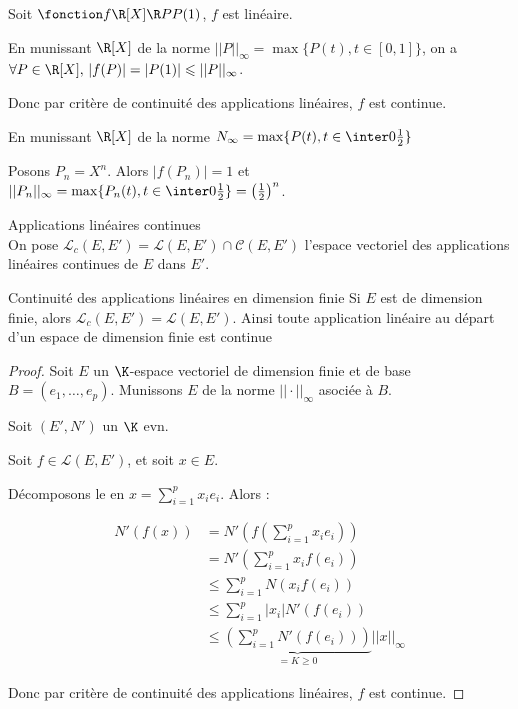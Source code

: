 \begin{exemple}
    Soit $\fonction f {\R[X]} \R P {P(1)}$, $f$ est linéaire. 

    \avspace En munissant $\R[X]$ de la norme $||P||_\infty = \max\{P(t), t \in [0, 1]\}$, on a 
    $\forall P \in \R[X], \, |f(P)| = |P(1)| \leqslant ||P||_\infty$.

    Donc par critère de continuité des applications linéaires, $f$ est continue.

    \avspace En munissant $\R[X]$ de la norme $N_\infty = \max\{P(t), t \in \inter 0 {\frac 1 2}\}$

    Posons $P_n = X^n$. Alors $| f(P_n) | = 1$ et $||P_n||_\infty = \max\{P_n(t), t \in \inter 0 {\frac 1 2}\} = \left(\frac 1 2\right)^n$.
\end{exemple}

\begin{definition}{Applications linéaires continues}{}
    \\On pose $\mathscr L_c(E, E') = \mathscr L (E, E') \cap \mathscr C(E, E')$ l'espace vectoriel 
    des applications linéaires continues de $E$ dans $E'$.
\end{definition}

\begin{theoreme}{Continuité des applications linéaires en dimension finie}{}
    Si $E$ est de dimension finie, alors $\mathscr L_c(E, E') = \mathscr L(E, E')$.
    Ainsi toute application linéaire au départ d'un espace de dimension finie est continue
\end{theoreme}

\begin{proof}
    Soit $E$ un $\K$-espace vectoriel de dimension finie et de base 
    $B = (e_1, \ldots, e_p)$. Munissons $E$ de la norme $||\cdot||_\infty$ asociée à $B$.

    Soit $(E', N')$ un $\K$ evn. 

    Soit $f \in \mathscr L(E, E')$, et soit $x \in E$. 

    Décomposons le en $\displaystyle x = \sum_{i=1}^p x_i e_i$. Alors : 

    \begin{align*}
        N'(f(x)) & = N'\left( f\left( \sum_{i=1}^p x_i e_i \right) \right) \\
        & = N'\left( \sum_{i=1}^p x_i f(e_i) \right) \\
        & \leqslant \sum_{i=1}^p N(x_i f(e_i)) \\
        & \leqslant \sum_{i=1}^p |x_i| N'(f(e_i)) \\
        & \leqslant \underbrace{\left( \sum_{i=1}^p N'(f(e_i)) \right)}_{ = K \geqslant 0} ||x||_\infty
    \end{align*}

    Donc par critère de continuité des applications linéaires, $f$ est continue.
\end{proof}

